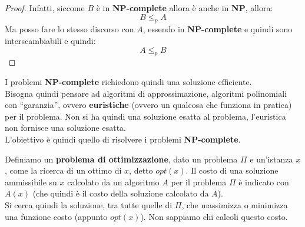 										\begin{proof}
											Infatti, siccome $B$ è in \textbf{NP-complete} allora è anche in \textbf{NP},
											allora: 
											\[B\leq_p A\]
											Ma posso fare lo stesso discorso con $A$, essendo in \textbf{NP-complete} e
											quindi sono interscambiabili e quindi:
											\[A\leq_p B\]
										\end{proof}
										I problemi \textbf{NP-complete} richiedono quindi una soluzione efficiente.\\
										Bisogna quindi pensare ad algoritmi di approssimazione, algoritmi polinomiali
										con ``garanzia'', ovvero \textbf{euristiche} (ovvero un qualcosa che funziona in
										pratica) per il problema. Non si ha quindi una soluzione esatta al problema,
										l'euristica non fornisce una soluzione esatta.\\
										L'obiettivo è quindi quello di risolvere i problemi \textbf{NP-complete}.
										\begin{definizione}
											Definiamo un \textbf{problema di ottimizzazione}, dato un problema $\Pi$ e
											un'istanza $x$, come la ricerca di un ottimo di $x$, detto $opt(x)$. Il costo
											di una soluzione ammissibile su $x$ calcolato da un algoritmo $A$ per il
											problema $\Pi$ è indicato con $A(x)$ (che quindi è il costo della soluzione
											calcolato da $A$).\\
																						  
											Si cerca quindi la soluzione, tra tutte quelle di $\Pi$, che massimizza o
											minimizza una funzione costo (appunto $opt(x)$). Non sappiamo chi calcoli
											questo costo.
										\end{definizione}
